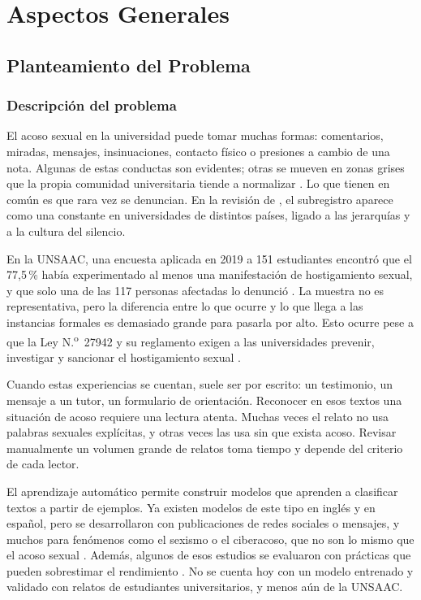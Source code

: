 \chapter{Aspectos Generales}

\section{Planteamiento del Problema}

\subsection{Descripción del problema}
El acoso sexual en la universidad puede tomar muchas formas: comentarios, miradas, mensajes, insinuaciones, contacto físico o presiones a cambio de una nota. Algunas de estas conductas son evidentes; otras se mueven en zonas grises que la propia comunidad universitaria tiende a normalizar \citep{rios2026}. Lo que tienen en común es que rara vez se denuncian. En la revisión de \citet{bondestam2020}, el subregistro aparece como una constante en universidades de distintos países, ligado a las jerarquías y a la cultura del silencio.

En la UNSAAC, una encuesta aplicada en 2019 a 151 estudiantes encontró que el 77,5\,\% había experimentado al menos una manifestación de hostigamiento sexual, y que solo una de las 117 personas afectadas lo denunció \citep{gutierrez2022}. La muestra no es representativa, pero la diferencia entre lo que ocurre y lo que llega a las instancias formales es demasiado grande para pasarla por alto. Esto ocurre pese a que la Ley N.\textsuperscript{o}~27942 y su reglamento exigen a las universidades prevenir, investigar y sancionar el hostigamiento sexual \citep{ley27942, ds0142019}.

Cuando estas experiencias se cuentan, suele ser por escrito: un testimonio, un mensaje a un tutor, un formulario de orientación. Reconocer en esos textos una situación de acoso requiere una lectura atenta. Muchas veces el relato no usa palabras sexuales explícitas, y otras veces las usa sin que exista acoso. Revisar manualmente un volumen grande de relatos toma tiempo y depende del criterio de cada lector.

El aprendizaje automático permite construir modelos que aprenden a clasificar textos a partir de ejemplos. Ya existen modelos de este tipo en inglés y en español, pero se desarrollaron con publicaciones de redes sociales o mensajes, y muchos para fenómenos como el sexismo o el ciberacoso, que no son lo mismo que el acoso sexual \citep{salawu2020, dutta2025, escobar2022, imbaquinga2025, cumba2018}. Además, algunos de esos estudios se evaluaron con prácticas que pueden sobrestimar el rendimiento \citep{wijaya2022, kapoor2023}. No se cuenta hoy con un modelo entrenado y validado con relatos de estudiantes universitarios, y menos aún de la UNSAAC.

